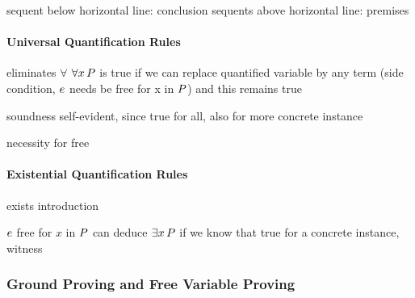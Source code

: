 
                sequent below horizontal line: conclusion
                sequents above horizontal line: premises

                \paragraph{Universal Quantification Rules}
                    eliminates $\forall$
                    $\forall x{\,} P$ is true if we can replace quantified variable by any term (side condition, $e$ needs be free for x in $P$) and this remains true



                    soundness self-evident, since true for all, also for more concrete instance

                    \begin{example}
                        necessity for free

                    \end{example}

                \paragraph{Existential Quantification Rules}
                    exists introduction

                    \begin{calculus}
                    \end{calculus}

                    $e$ free for $x$ in $P$
                    can deduce $\exists x{\,} P$ if we know that true for a concrete instance, witness

            \subsubsection{Ground Proving and Free Variable Proving}
                \label{sec:ground-proving-free-variable-proving}



